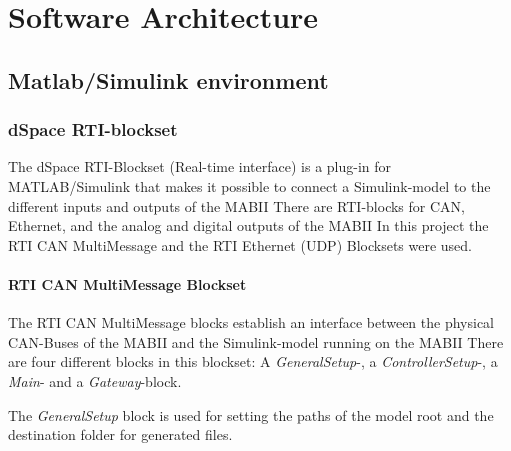 \documentclass[ExampleMasters.tex]{subfiles}
\begin{document}
\clearpage
{\pagestyle{empty}\cleardoublepage}%


\chapter{Software Architecture}
\label{chap:software_setup}


\section{Matlab/Simulink environment}
\label{sec:matlab}




\subsection{dSpace RTI-blockset}

The dSpace RTI-Blockset (Real-time interface) is a plug-in for MATLAB/Simulink that makes it possible to connect a Simulink-model to the different inputs and outputs of the \gls{MABII} There are \gls{RTI}-blocks for \gls{CAN}, Ethernet, and the analog and digital outputs of the \gls{MABII}
In this project the \gls{RTI} \gls{CAN} MultiMessage and the \gls{RTI} Ethernet (UDP) Blocksets were used.\\ 
\subsubsection{RTI \gls{CAN} MultiMessage Blockset}
The \gls{RTI} \gls{CAN} MultiMessage blocks establish an interface between the physical \gls{CAN}-Buses of the \gls{MABII} and the Simulink-model running on the \gls{MABII} There are four different blocks in this blockset: A \textit{GeneralSetup}-, a \textit{ControllerSetup}-, a \textit{Main}- and a \textit{Gateway}-block. 

The \textit{GeneralSetup} block is used for setting the paths of the model root and the destination folder for generated files. 
\end{document}

